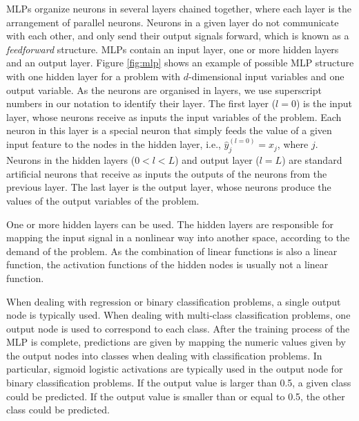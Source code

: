 MLPs organize neurons in several layers chained together, where each layer is the arrangement of parallel neurons. Neurons in a given layer do not communicate with each other, and only send their output signals forward, which is known as a \textit{feedforward} structure. MLPs contain an input layer, one or more hidden layers and an output layer. Figure \ref{fig:mlp} shows an example of possible MLP structure with one hidden layer for a problem with $d$-dimensional input variables and one output variable. As the neurons are organised in layers, we use superscript numbers in our notation to identify their layer. The first layer ($l=0$) is the input layer, whose neurons receive as inputs the input variables of the problem. Each neuron in this layer is a special neuron that simply feeds the value of a given input feature to the nodes in the hidden layer, i.e., $\hat{y}^{(l=0)}_j = x_j$, where $j$. Neurons in the hidden layers ($0<l<L$) and output layer ($l=L$) are standard artificial neurons that receive as inputs the outputs of the neurons from the previous layer. The last layer is the output layer, whose neurons produce the values of the output variables of the problem. 

One or more hidden layers can be used.  The hidden layers are responsible for mapping the input signal in a nonlinear way into another space, according to the demand of the problem. As the combination of linear functions is also a linear function, the activation functions of the hidden nodes is usually not a linear function. 

When dealing with regression or binary classification problems, a single output node is typically used. When dealing with multi-class classification problems, one output node is used to correspond to each class. After the training process of the MLP is complete, predictions are given by mapping the numeric values given by the output nodes into classes when dealing with classification problems. In particular, sigmoid logistic activations are typically used in the output node for binary classification problems. If the output value is larger than 0.5, a given class could be predicted. If the output value is smaller than or equal to 0.5, the other class could be predicted.  


